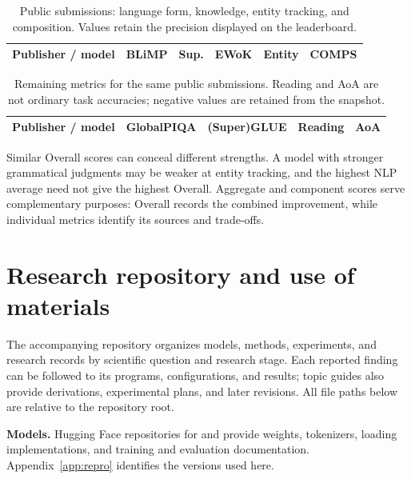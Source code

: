 \begin{table}[htbp]
\caption{Public submissions: language form, knowledge, entity tracking, and composition. Values retain the precision displayed on the leaderboard.}
\scriptsize\setlength{\tabcolsep}{3pt}
\begin{tabularx}{\linewidth}{@{}Yrrrrr@{}}
\toprule Publisher / model & BLiMP & Sup. & EWoK & Entity & COMPS\\\midrule

\end{tabularx}
\end{table}

\begin{table}[htbp]
\caption{Remaining metrics for the same public submissions. Reading and AoA are not ordinary task accuracies; negative values are retained from the snapshot.}
\scriptsize\setlength{\tabcolsep}{3pt}
\begin{tabularx}{\linewidth}{@{}Yrrrr@{}}
\toprule Publisher / model & GlobalPIQA & (Super)GLUE & Reading & AoA\\\midrule

\end{tabularx}
\end{table}

Similar Overall scores can conceal different strengths. A model with stronger grammatical judgments may be weaker at entity tracking, and the highest NLP average need not give the highest Overall. Aggregate and component scores serve complementary purposes: Overall records the combined improvement, while individual metrics identify its sources and trade-offs.

\par\FloatBarrier{}
\section{Research repository and use of materials}
\label{app:assets}

The accompanying repository organizes models, methods, experiments, and research records by scientific question and research stage. Each reported finding can be followed to its programs, configurations, and results; topic guides also provide derivations, experimental plans, and later revisions. All file paths below are relative to the repository root.

\textbf{Models.} Hugging Face repositories for \href{https://huggingface.co/leslie721007/Qiushi-Engine-Frontier-Advancement}{\Frontier{}} and \href{https://huggingface.co/leslie721007/Qiushi-Engine-Principle-Guided-Frontier-Advancement}{\Guided{}} provide weights, tokenizers, loading implementations, and training and evaluation documentation. Appendix~\ref{app:repro} identifies the versions used here.


